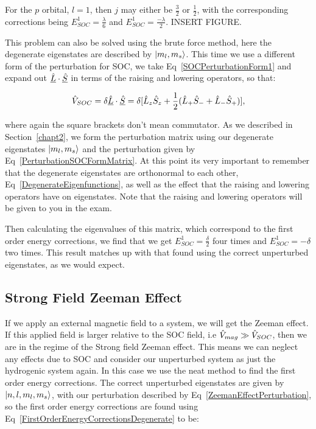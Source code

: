 \noindent For the $p$ orbital, $l = 1$, then $j$ may either be $\frac{3}{2}$ or $\frac{1}{2}$, with the corresponding corrections being $E^1_{SOC} = \frac{\lambda}{6}$ and $E^1_{SOC} = \frac{-\lambda}{2}$. INSERT FIGURE.

\noindent This problem can also be solved using the brute force method, here the degenerate eigenstates are described by $\ket{m_l, m_s}$. This time we use a different form of the perturbation for SOC, we take Eq~\ref{SOCPerturbationForm1} and expand out $\underline{\Hat{L}} \cdot \underline{\Hat{S}}$ in terms of the raising and lowering operators, so that:

\begin{equation}
    \Hat{V}_{SOC} = \delta \underline{\Hat{L}} \cdot \underline{\Hat{S}} = \delta [\Hat{L}_z \Hat{S}_z + \frac{1}{2}(\Hat{L}_+ \Hat{S}_- + \Hat{L}_- \Hat{S}_+)],
    \label{PerturbationSOCFormMatrix}
\end{equation}

\noindent where again the square brackets don't mean commutator. As we described in Section~\ref{chapt2}, we form the perturbation matrix using our degenerate eigenstates $\ket{m_l, m_s}$ and the perturbation given by Eq~\ref{PerturbationSOCFormMatrix}. At this point its very important to remember that the degenerate eigenstates are orthonormal to each other, Eq~\ref{DegenerateEigenfunctions}, as well as the effect that the raising and lowering operators have on eigenstates. Note that the raising and lowering operators will be given to you in the exam.

\noindent Then calculating the eigenvalues of this matrix, which correspond to the first order energy corrections, we find that we get $E^1_{SOC} = \frac{\delta}{2}$ four times and $E^1_{SOC} = -\delta$ two times. This result matches up with that found using the correct unperturbed eigenstates, as we would expect.

\subsection{Strong Field Zeeman Effect}

If we apply an external magnetic field to a system, we will get the Zeeman effect. If this applied field is larger relative to the SOC field, i.e $\Hat{V}_{mag} \gg \Hat{V}_{SOC}$, then we are in the regime of the Strong field Zeeman effect. This means we can neglect any effects due to SOC and consider our unperturbed system as just the hydrogenic system again. In this case we use the neat method to find the first order energy corrections. The correct unperturbed eigenstates are given by $\ket{n, l, m_l, m_s}$, with our perturbation described by Eq~\ref{ZeemanEffectPerturbation}, so  the first order energy corrections are found using Eq~\ref{FirstOrderEnergyCorrectionsDegenerate} to be:

